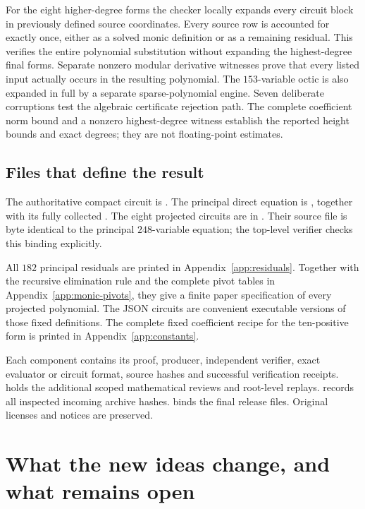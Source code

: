 \documentclass[11pt,letterpaper]{article}
\theoremstyle{definition}
\theoremstyle{remark}
\begin{document}
For the eight higher-degree forms the checker locally expands every circuit
block in previously defined source coordinates.  Every source row is
accounted for exactly once, either as a solved monic definition or as a
remaining residual.  This verifies the entire polynomial substitution
without expanding the highest-degree final forms.  Separate nonzero modular
derivative witnesses prove that every listed input actually occurs in the
resulting polynomial.  The $153$-variable octic is also expanded in full by a
separate sparse-polynomial engine.  Seven deliberate corruptions test the
algebraic certificate rejection path.  The complete coefficient norm bound
and a nonzero highest-degree witness establish the reported height bounds
and exact degrees; they are not floating-point estimates.

\subsection{Files that define the result}

The authoritative compact circuit is
.  The principal direct equation is
, together with its
fully collected .  The eight projected
circuits are in .  Their source file is byte
identical to the principal $248$-variable equation; the top-level verifier
checks this binding explicitly.

All $182$ principal residuals are printed in Appendix~\ref{app:residuals}.
Together with the recursive elimination rule and the complete pivot tables
in Appendix~\ref{app:monic-pivots}, they give a finite paper specification of every
projected polynomial.  The JSON circuits are convenient executable versions
of those fixed definitions.  The complete fixed coefficient recipe for the
ten-positive form is printed in Appendix~\ref{app:constants}.

Each component contains its proof, producer, independent verifier, exact
evaluator or circuit format, source hashes and successful verification
receipts.   holds the additional scoped mathematical reviews
and root-level replays.   records all inspected
incoming archive hashes.   binds the final release
files.  Original licenses and notices are preserved.

\section{What the new ideas change, and what remains open}
\label{sec:outlook}
\end{document}
